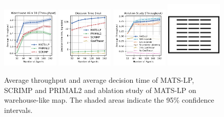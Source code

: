 \documentclass[letterpaper]{article} %
\begin{document}
\begin{figure}[t!]

    \centering
    \includegraphics[width=0.24\textwidth]{figures/05-warehouse-throughput.pdf}
    \includegraphics[width=0.24\textwidth]{figures/06-warehouse-runtime.pdf}
    \includegraphics[width=0.24\textwidth]{figures/07-warehouse-ablations.pdf}
    \hspace{10px}
    \includegraphics[width=0.24\textwidth]{figures/warehouse-map.png}

    \caption{Average throughput and average decision time of MATS-LP, SCRIMP and PRIMAL2 and ablation study of MATS-LP on warehouse-like map. The shaded areas indicate the 95\% confidence intervals.}
    \label{fig:warehouse}

\end{figure}
\end{document}
